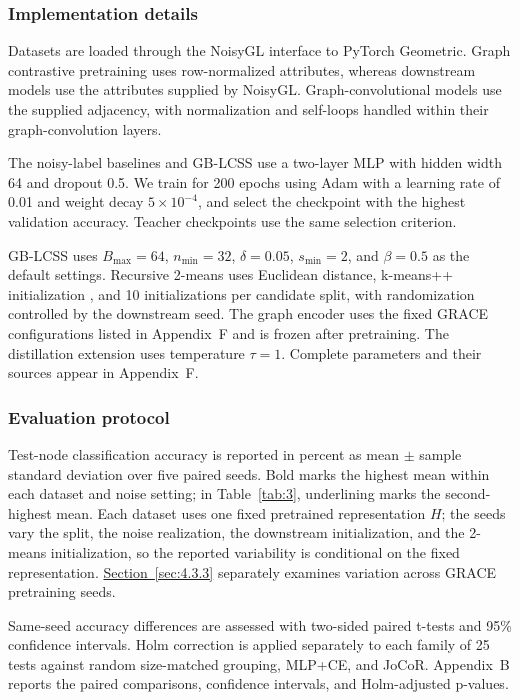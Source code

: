 \documentclass[10pt,letterpaper,nopreprintline]{elsarticle}
\theoremstyle{plain}
\begin{document}
\subsubsection{Implementation details}\label{sec:4.1.4}

Datasets are loaded through the NoisyGL interface to PyTorch Geometric. Graph contrastive pretraining uses row-normalized attributes, whereas downstream models use the attributes supplied by NoisyGL. Graph-convolutional models use the supplied adjacency, with normalization and self-loops handled within their graph-convolution layers.

The noisy-label baselines and GB-LCSS use a two-layer MLP with hidden width 64 and dropout 0.5. We train for 200 epochs using Adam with a learning rate of 0.01 and weight decay \(5 \times 10^{- 4}\), and select the checkpoint with the highest validation accuracy. Teacher checkpoints use the same selection criterion.

GB-LCSS uses \(B_{\max} = 64\), \(n_{\min} = 32\), \(\delta = 0.05\), \(s_{\min} = 2\), and \(\beta = 0.5\) as the default settings. Recursive 2-means uses Euclidean distance, k-means++ initialization \cite{ref71}, and 10 initializations per candidate split, with randomization controlled by the downstream seed. The graph encoder uses the fixed GRACE configurations listed in Appendix~F and is frozen after pretraining. The distillation extension uses temperature \(\tau = 1\). Complete parameters and their sources appear in Appendix~F.



\subsubsection{Evaluation protocol}\label{sec:4.1.5}

Test-node classification accuracy is reported in percent as mean \ensuremath{\pm} sample standard deviation over five paired seeds. Bold marks the highest mean within each dataset and noise setting; in Table~\ref{tab:3}, underlining marks the second-highest mean. Each dataset uses one fixed pretrained representation \(H\); the seeds vary the split, the noise realization, the downstream initialization, and the 2-means initialization, so the reported variability is conditional on the fixed representation. \hyperref[sec:4.3.3]{Section~\ref*{sec:4.3.3}} separately examines variation across GRACE pretraining seeds.

Same-seed accuracy differences are assessed with two-sided paired t-tests and 95\% confidence intervals. Holm correction \cite{ref72} is applied separately to each family of 25 tests against random size-matched grouping, MLP+CE, and JoCoR. Appendix~B reports the paired comparisons, confidence intervals, and Holm-adjusted p-values.
\end{document}
